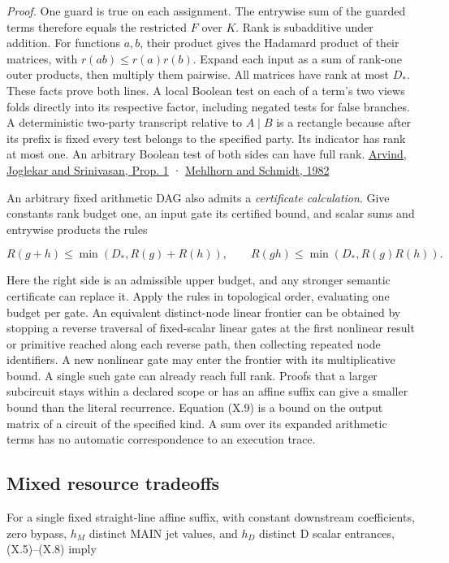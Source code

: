 \documentclass[
  11pt,
]{article}
\begin{document}
\emph{Proof.} One guard is true on each assignment. The entrywise sum of
the guarded terms therefore equals the restricted \(F\) over \(K\). Rank
is subadditive under addition. For functions \(a,b\), their product
gives the Hadamard product of their matrices, with
\(r(ab)\le r(a)r(b)\). Expand each input as a sum of rank-one outer
products, then multiply them pairwise. All matrices have rank at most
\(D_*\). These facts prove both lines. A local Boolean test on each of a
term's two views folds directly into its respective factor, including
negated tests for false branches. A deterministic two-party transcript
relative to \(A\mid B\) is a rectangle because after its prefix is fixed
every test belongs to the specified party. Its indicator has rank at
most one. An arbitrary Boolean test of both sides can have full rank.
\href{https://arxiv.org/pdf/0907.4006}{Arvind, Joglekar and Srinivasan,
Prop. 1} · \href{https://doi.org/10.1145/800070.802208}{Mehlhorn and
Schmidt, 1982}

An arbitrary fixed arithmetic DAG also admits a \emph{certificate
calculation}. Give constants rank budget one, an input gate its
certified bound, and scalar sums and entrywise products the rules

\[
 R(g+h)\le\min(D_*,R(g)+R(h)),\qquad
 R(gh)\le\min(D_*,R(g)R(h)).
 \tag{X.9}
\]

Here the right side is an admissible upper budget, and any stronger
semantic certificate can replace it. Apply the rules in topological
order, evaluating one budget per gate. An equivalent distinct-node
linear frontier can be obtained by stopping a reverse traversal of
fixed-scalar linear gates at the first nonlinear result or primitive
reached along each reverse path, then collecting repeated node
identifiers. A new nonlinear gate may enter the frontier with its
multiplicative bound. A single such gate can already reach full rank.
Proofs that a larger subcircuit stays within a declared scope or has an
affine suffix can give a smaller bound than the literal recurrence.
Equation (X.9) is a bound on the output matrix of a circuit of the
specified kind. A sum over its expanded arithmetic terms has no
automatic correspondence to an execution trace.

\subsection{Mixed resource tradeoffs}\label{mixed-resource-tradeoffs}

For a single fixed straight-line affine suffix, with constant downstream
coefficients, zero bypass, \(h_M\) distinct MAIN jet values, and \(h_D\)
distinct D scalar entrances, (X.5)--(X.8) imply
\end{document}

